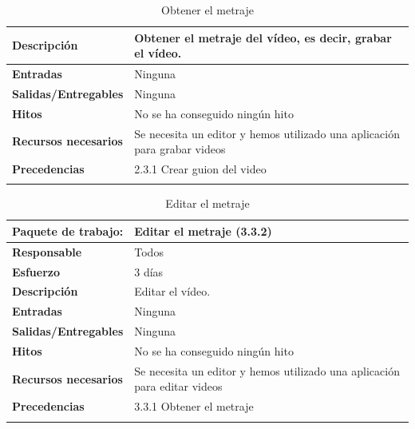 \documentclass{report}
\begin{document}
\begin{center}
\begin{longtable}{|p{6cm}|p{6cm}|}
                    \hline
                    \textbf{Descripción} & Obtener el metraje del vídeo, es decir, grabar el vídeo.\\
                    \hline
                    \textbf{Entradas} & Ninguna\\
                    \hline
                    \textbf{Salidas/Entregables} & Ninguna \\
                    \hline
                    \textbf{Hitos} & No se ha conseguido ningún hito\\
                    \hline
                    \textbf{Recursos necesarios} & Se necesita un editor y hemos utilizado una aplicación para grabar videos\\
                    \hline
                    \textbf{Precedencias} & 2.3.1 Crear guion del video\\
                    \hline
                    \caption{Obtener el metraje}
                \end{longtable}
                \begin{longtable}{|p{6cm}|p{6cm}|}
                    \hline
                    \textbf{Paquete de trabajo:} & Editar el metraje (3.3.2)\\
                    \hline
                    \textbf{Responsable} & Todos\\
                    \hline
                    \textbf{Esfuerzo} & 3 días\\
                    \hline
                    \textbf{Descripción} & Editar el vídeo.\\
                    \hline
                    \textbf{Entradas} & Ninguna\\
                    \hline
                    \textbf{Salidas/Entregables} & Ninguna \\
                    \hline
                    \textbf{Hitos} & No se ha conseguido ningún hito\\
                    \hline
                    \textbf{Recursos necesarios} & Se necesita un editor y hemos utilizado una aplicación para editar videos\\
                    \hline
                    \textbf{Precedencias} & 3.3.1 Obtener el metraje\\
                    \hline
                    \caption{Editar el metraje}
                \end{longtable}
                \clearpage
                \begin{longtable}{|p{6cm}|p{6cm}|}

\end{longtable}
\end{center}
\end{document}

